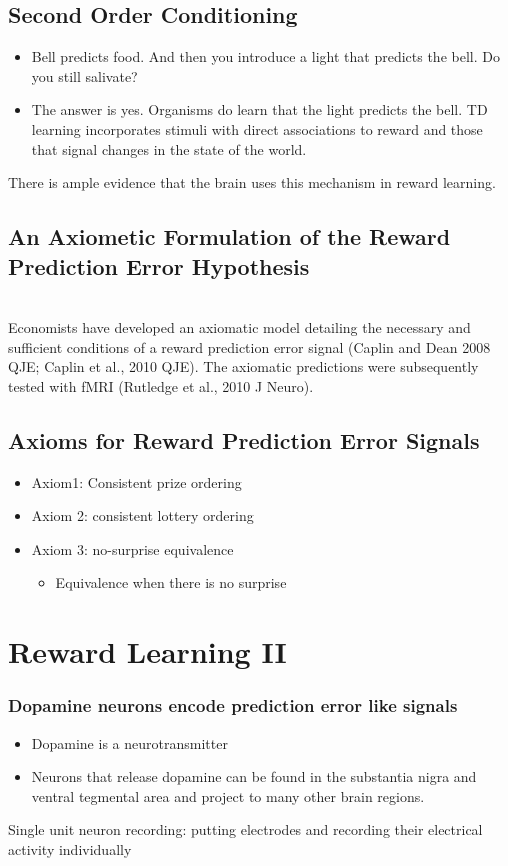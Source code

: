 \subsection{Second Order Conditioning}
\begin{itemize}
    \item Bell predicts food. And then you introduce a light that predicts the bell. Do you still salivate?
    \item The answer is yes. Organisms do learn that the light predicts the bell. TD learning incorporates stimuli with direct associations to reward and those that signal changes in the state of the world.
\end{itemize}

There is ample evidence that the brain uses this mechanism in reward learning.

\subsection{An Axiometic Formulation of the Reward Prediction Error Hypothesis}
\\Economists have developed an axiomatic model detailing the necessary and sufficient
conditions of a reward prediction error signal (Caplin and Dean 2008 QJE; Caplin et al.,
2010 QJE). The axiomatic predictions were subsequently tested with fMRI (Rutledge et al., 2010 J
Neuro). 

\subsection{Axioms for Reward Prediction Error Signals}
\begin{itemize}
    \item Axiom1: Consistent prize ordering
    \item Axiom 2: consistent lottery ordering
    \item Axiom 3: no-surprise equivalence
    \begin{itemize}
        \item Equivalence when there is no surprise
    \end{itemize}
\end{itemize}

\section{Reward Learning II}
\subsubsection{Dopamine neurons encode prediction error like signals}
\begin{itemize}
    \item Dopamine is a neurotransmitter
    \item Neurons that release dopamine can be found in the substantia nigra and ventral tegmental area and project to many other brain regions.
\end{itemize}
Single unit neuron recording: putting electrodes and recording their electrical activity individually

